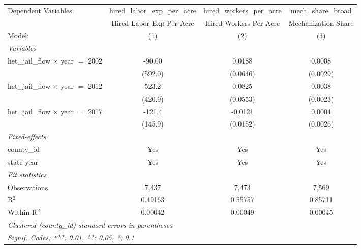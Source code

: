
\begingroup
\centering
\begin{tabular}{lccc}
   \tabularnewline \midrule \midrule
   Dependent Variables:                      & hired\_labor\_exp\_per\_acre     & hired\_workers\_per\_acre    & mech\_share\_broad\\    
                                             & Hired Labor Exp Per Acre         & Hired Workers Per Acre       & Mechanization Share \\   
   Model:                                    & (1)                              & (2)                          & (3)\\  
   \midrule
   \emph{Variables}\\
   het\_jail\_flow $\times$ year $=$ 2002    & -90.00                           & 0.0188                       & 0.0008\\   
                                             & (592.0)                          & (0.0646)                     & (0.0029)\\   
   het\_jail\_flow $\times$ year $=$ 2012    & 523.2                            & 0.0825                       & 0.0038\\   
                                             & (420.9)                          & (0.0553)                     & (0.0023)\\   
   het\_jail\_flow $\times$ year $=$ 2017    & -121.4                           & -0.0121                      & 0.0004\\   
                                             & (145.9)                          & (0.0152)                     & (0.0026)\\   
   \midrule
   \emph{Fixed-effects}\\
   county\_id                                & Yes                              & Yes                          & Yes\\  
   state-year                                & Yes                              & Yes                          & Yes\\  
   \midrule
   \emph{Fit statistics}\\
   Observations                              & 7,437                            & 7,473                        & 7,569\\  
   R$^2$                                     & 0.49163                          & 0.55757                      & 0.85711\\  
   Within R$^2$                              & 0.00042                          & 0.00049                      & 0.00045\\  
   \midrule \midrule
   \multicolumn{4}{l}{\emph{Clustered (county\_id) standard-errors in parentheses}}\\
   \multicolumn{4}{l}{\emph{Signif. Codes: ***: 0.01, **: 0.05, *: 0.1}}\\
\end{tabular}
\par\endgroup


